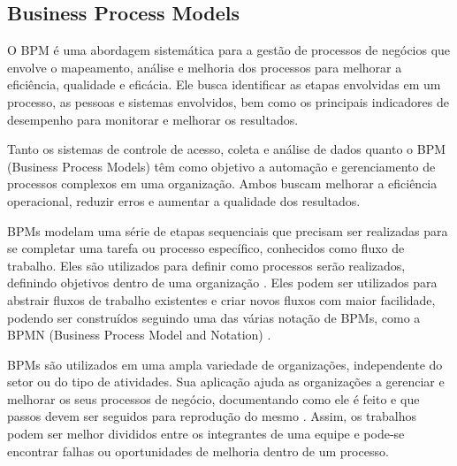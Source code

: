 \subsection{Business Process Models}


O BPM é uma abordagem sistemática para a gestão de processos de negócios que envolve o mapeamento, análise e melhoria dos processos para melhorar a eficiência, qualidade e eficácia. Ele busca identificar as etapas envolvidas em um processo, as pessoas e sistemas envolvidos, bem como os principais indicadores de desempenho para monitorar e melhorar os resultados.


Tanto os sistemas de controle de acesso, coleta e análise de dados quanto o BPM (Business Process Models) têm como objetivo a automação e gerenciamento de processos complexos em uma organização. Ambos buscam melhorar a eficiência operacional, reduzir erros e aumentar a qualidade dos resultados.


BPMs modelam uma série de etapas sequenciais que precisam ser realizadas para se completar uma tarefa ou processo específico, conhecidos como fluxo de trabalho. Eles são utilizados para definir como processos serão realizados, definindo objetivos dentro de uma organização \cite{Alves2014UnderstandingOrganizations}. Eles podem ser utilizados para abstrair fluxos de trabalho existentes e criar novos fluxos com maior facilidade, podendo ser construídos seguindo uma das várias notação de BPMs, como a BPMN (Business Process Model and Notation) \cite{Dijkman2008SemanticsBPMN}.



BPMs são utilizados em uma ampla variedade de organizações, independente do setor ou do tipo de atividades. Sua aplicação ajuda as organizações a gerenciar e melhorar os seus processos de negócio, documentando como ele é feito e que passos devem ser seguidos para reprodução do mesmo \R. Assim, os trabalhos podem ser melhor divididos entre os integrantes de uma equipe e pode-se encontrar falhas ou oportunidades de melhoria dentro de um processo.

